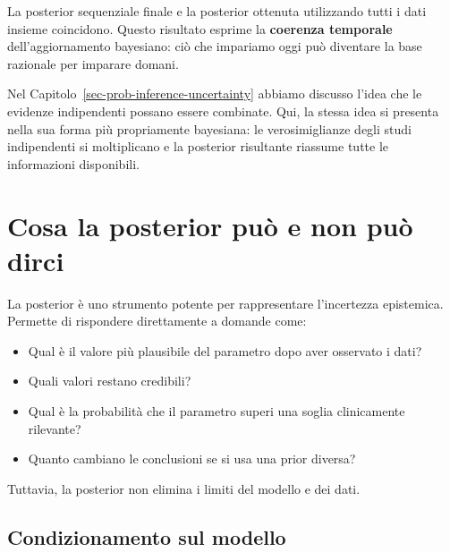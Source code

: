 \documentclass[
  italian,
  letterpaper,
  a4paper,
  11pt,
  open=any]{scrbook}
\providecommand{\tightlist}{%
  \setlength{\itemsep}{0pt}\setlength{\parskip}{0pt}}
\theoremstyle{plain}
\theoremstyle{definition}
\theoremstyle{definition}
\theoremstyle{remark}
\begin{document}
La posterior sequenziale finale e la posterior ottenuta utilizzando
tutti i dati insieme coincidono. Questo risultato esprime la
\textbf{coerenza temporale} dell'aggiornamento bayesiano: ciò che
impariamo oggi può diventare la base razionale per imparare domani.

\begin{tcolorbox}[enhanced jigsaw, arc=.35mm, bottomrule=.15mm, bottomtitle=1mm, breakable, colback=white, colbacktitle=quarto-callout-note-color!10!white, colframe=quarto-callout-note-color-frame, coltitle=black, left=2mm, leftrule=.75mm, opacityback=0, opacitybacktitle=0.6, rightrule=.15mm, title=\textcolor{quarto-callout-note-color}{\faInfo}\hspace{0.5em}{Collegamento con la combinazione di evidenze}, titlerule=0mm, toprule=.15mm, toptitle=1mm]

Nel Capitolo~\ref{sec-prob-inference-uncertainty} abbiamo discusso
l'idea che le evidenze indipendenti possano essere combinate. Qui, la
stessa idea si presenta nella sua forma più propriamente bayesiana: le
verosimiglianze degli studi indipendenti si moltiplicano e la posterior
risultante riassume tutte le informazioni disponibili.

\end{tcolorbox}

\section{Cosa la posterior può e non può
dirci}\label{sec-what-posterior-can-say}

La posterior è uno strumento potente per rappresentare l'incertezza
epistemica. Permette di rispondere direttamente a domande come:

\begin{itemize}
\tightlist
\item
  Qual è il valore più plausibile del parametro dopo aver osservato i
  dati?
\item
  Quali valori restano credibili?
\item
  Qual è la probabilità che il parametro superi una soglia clinicamente
  rilevante?
\item
  Quanto cambiano le conclusioni se si usa una prior diversa?
\end{itemize}

Tuttavia, la posterior non elimina i limiti del modello e dei dati.

\subsection{Condizionamento sul
modello}\label{condizionamento-sul-modello}
\end{document}

